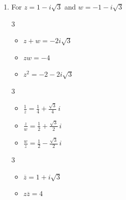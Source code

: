 \documentclass{ximera}
\begin{document}
\begin{enumerate}
\begin{multicols}{3}
\begin{itemize}

\item $\overline{z} = \sqrt{2}+i\sqrt{2}$

\item $z\overline{z} = 4$

\item $(\overline{z})^2 = 4i$

\end{itemize}

\end{multicols}

\item  For   $z = 1 - i\sqrt{3}$ and $w = -1-i\sqrt{3}$

\begin{multicols}{3}

\begin{itemize}

\item $z+w = -2i\sqrt{3}$

\item $zw = -4$

\item $z^2 = -2-2i\sqrt{3}$

\end{itemize}

\end{multicols}

\begin{multicols}{3}

\begin{itemize}

\item $\frac{1}{z} = \frac{1}{4} + \frac{\sqrt{3}}{4} \,i$

\item $\frac{z}{w} = \frac{1}{2} + \frac{\sqrt{3}}{2} \,i$

\item $\frac{w}{z} = \frac{1}{2} - \frac{\sqrt{3}}{2} \,i$

\end{itemize}

\end{multicols}

\begin{multicols}{3}

\begin{itemize}

\item $\overline{z} = 1+i\sqrt{3}$

\item $z\overline{z} = 4$


\end{itemize}
\end{multicols}
\end{enumerate}
\end{document}
